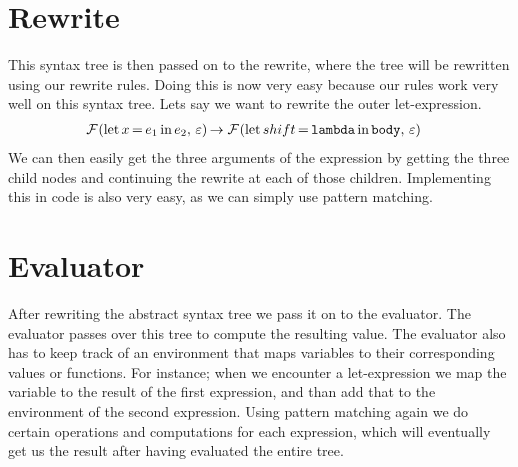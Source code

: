 \documentclass[../main.tex]{subfiles}
\newcommand{\asttitle}[1]{\texttt{#1}}
\begin{document}
\section{Rewrite}
This syntax tree is then passed on to the rewrite, where the tree will be rewritten using our rewrite rules. Doing this is now very easy because our rules work very well on this syntax tree. Lets say we want to rewrite the outer let-expression.
\begin{align*}
    \reduce{F}{\letexpr{x}{e_1}{e_2}}
        &\to \reduce{F}{\letexpr{shift}{\asttitle{lambda}}{\asttitle{body}}}
\end{align*}
%
We can then easily get the three arguments of the expression by getting the three child nodes and continuing the rewrite at each of those children. Implementing this in code is also very easy, as we can simply use pattern matching\cite{pattern-matching}.

\section{Evaluator}
After rewriting the abstract syntax tree we pass it on to the evaluator. The evaluator passes over this tree to compute the resulting value. The evaluator also has to keep track of an environment that maps variables to their corresponding values or functions. For instance; when we encounter a let-expression we map the variable to the result of the first expression, and than add that to the environment of the second expression. Using pattern matching again we do certain operations and computations for each expression, which will eventually get us the result after having evaluated the entire tree.
\end{document}
